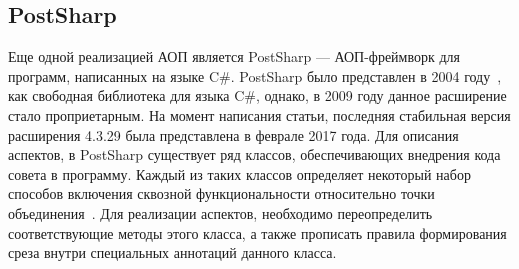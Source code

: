 \documentclass[conference]{IEEEtran}
\begin{document}

\subsection{PostSharp}

Еще одной реализацией АОП является PostSharp --- АОП-фреймворк для программ, 
написанных на языке C\#.
PostSharp было представлен в 2004 году~\cite{postsharp_doc}, как свободная
библиотека для языка C\#, однако, в 2009 году данное расширение стало
проприетарным.
На момент написания статьи, последняя стабильная версия расширения 4.3.29 была
представлена в феврале 2017 года.
Для описания аспектов, в PostSharp существует ряд классов, обеспечивающих
внедрения кода совета в программу.
Каждый из таких классов определяет некоторый набор способов включения сквозной
функциональности относительно точки объединения~\cite{postsharp_aspects}.
Для реализации аспектов, необходимо переопределить соответствующие методы этого
класса, а также прописать правила формирования среза внутри специальных
аннотаций данного класса.
\end{document}
